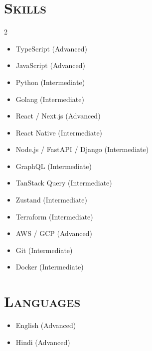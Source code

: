 \documentclass[a4paper,10pt]{article}
\newcommand{\resumesection}[1]{\section*{\scshape{#1}}}
\begin{document}
\resumesection{Skills}
\begin{multicols}{2}
\begin{itemize}[leftmargin=0.5cm, label={}]
  \item TypeScript (Advanced)
  \item JavaScript (Advanced)
  \item Python (Intermediate)
  \item Golang (Intermediate)
  \item React / Next.js (Advanced)
  \item React Native (Intermediate)
  \item Node.js / FastAPI / Django (Intermediate)
  \item GraphQL (Intermediate)
  \item TanStack Query (Intermediate)
  \item Zustand (Intermediate)
  \item Terraform (Intermediate)
  \item AWS / GCP (Advanced)
  \item Git (Intermediate)
  \item Docker (Intermediate)
\end{itemize}
\end{multicols}

\resumesection{Languages}
\begin{itemize}[leftmargin=0.5cm]
  \item English (Advanced)
  \item Hindi (Advanced)
\end{itemize}
\end{document}

